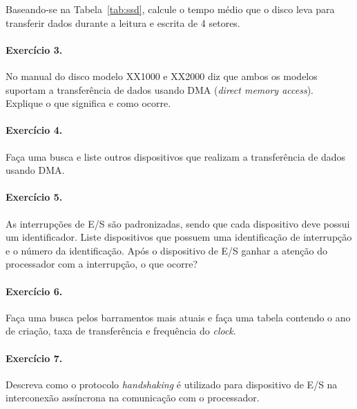 \noindent Baseando-se na Tabela~\ref{tab:ssd}, calcule o tempo médio
que o disco leva para transferir dados durante a leitura e escrita de
4 setores.

\paragraph{Exercício 3.} No manual do disco modelo XX1000 e XX2000 diz
que ambos os modelos suportam a transferência de dados usando DMA
(\emph{direct memory access}).  Explique o que significa e como
ocorre.

\paragraph{Exercício 4.} Faça uma busca e liste outros dispositivos
que realizam a transferência de dados usando DMA.

\paragraph{Exercício 5.} As interrupções de E/S são padronizadas,
sendo que cada dispositivo deve possui um identificador. Liste
dispositivos que possuem uma identificação de interrupção e o número
da identificação.  Após o dispositivo de E/S ganhar a atenção do
processador com a interrupção, o que ocorre?

\paragraph{Exercício 6.} Faça uma busca pelos barramentos mais atuais
e faça uma tabela contendo o ano de criação, taxa de transferência e
frequência do \emph{clock}.

\paragraph{Exercício 7.} Descreva como o protocolo \emph{handshaking}
é utilizado para dispositivo de E/S na interconexão assíncrona na
comunicação com o processador.

